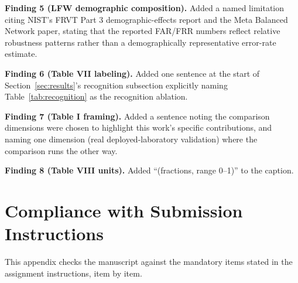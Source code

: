 \documentclass[conference]{IEEEtran}
\begin{document}
\textbf{Finding 5 (LFW demographic composition).} Added a named
limitation citing NIST's FRVT Part 3 demographic-effects report
and the Meta Balanced Network paper, stating that the reported
FAR/FRR numbers reflect relative robustness patterns rather than a
demographically representative error-rate estimate.

\textbf{Finding 6 (Table VII labeling).} Added one sentence at the
start of Section~\ref{sec:results}'s recognition subsection
explicitly naming Table~\ref{tab:recognition} as the recognition
ablation.

\textbf{Finding 7 (Table I framing).} Added a sentence noting the
comparison dimensions were chosen to highlight this work's specific
contributions, and naming one dimension (real deployed-laboratory
validation) where the comparison runs the other way.

\textbf{Finding 8 (Table VIII units).} Added ``(fractions, range
0--1)'' to the caption.

\section{Compliance with Submission Instructions}
\label{app:compliance}
This appendix checks the manuscript against the mandatory items
stated in the assignment instructions, item by item.
\end{document}
